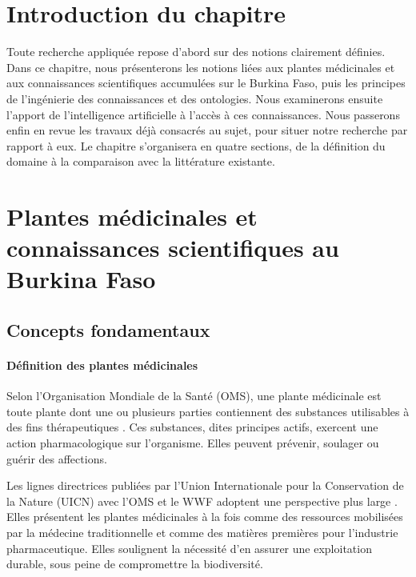 
\section*{Introduction du chapitre}

Toute recherche appliquée repose d'abord sur des notions clairement définies. Dans ce chapitre, nous présenterons les notions liées aux plantes médicinales et aux connaissances scientifiques accumulées sur le Burkina Faso, puis les principes de l'ingénierie des connaissances et des ontologies. Nous examinerons ensuite l'apport de l'intelligence artificielle à l'accès à ces connaissances. Nous passerons enfin en revue les travaux déjà consacrés au sujet, pour situer notre recherche par rapport à eux. Le chapitre s'organisera en quatre sections, de la définition du domaine à la comparaison avec la littérature existante.

\section{Plantes médicinales et connaissances scientifiques au Burkina Faso}
\label{sec:plantes_medicinales}

\subsection{Concepts fondamentaux}
\label{subsec:concepts_fondamentaux}

\paragraph{Définition des plantes médicinales}
Selon l'Organisation Mondiale de la Santé (OMS), une plante médicinale est toute plante dont une ou plusieurs parties contiennent des substances utilisables à des fins thérapeutiques \cite{who2000traditional}. Ces substances, dites principes actifs, exercent une action pharmacologique sur l'organisme. Elles peuvent prévenir, soulager ou guérir des affections.

Les lignes directrices publiées par l'Union Internationale pour la Conservation de la Nature (UICN) avec l'OMS et le WWF adoptent une perspective plus large \cite{iucn1993guidelines}. Elles présentent les plantes médicinales à la fois comme des ressources mobilisées par la médecine traditionnelle et comme des matières premières pour l'industrie pharmaceutique. Elles soulignent la nécessité d'en assurer une exploitation durable, sous peine de compromettre la biodiversité.


